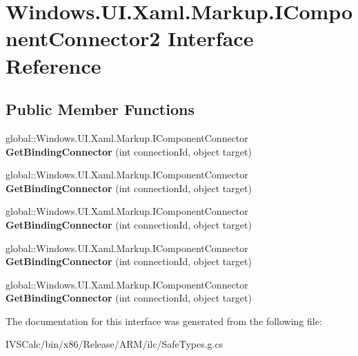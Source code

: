 \hypertarget{interface_windows_1_1_u_i_1_1_xaml_1_1_markup_1_1_i_component_connector2}{}\section{Windows.\+U\+I.\+Xaml.\+Markup.\+I\+Component\+Connector2 Interface Reference}
\label{interface_windows_1_1_u_i_1_1_xaml_1_1_markup_1_1_i_component_connector2}
\subsection*{Public Member Functions}
\begin{DoxyCompactItemize}
\item 
\mbox{\label{interface_windows_1_1_u_i_1_1_xaml_1_1_markup_1_1_i_component_connector2_ac161ef07e2cf95c2368e57429a0616c1}} 
global\+::\+Windows.\+U\+I.\+Xaml.\+Markup.\+I\+Component\+Connector {\bfseries Get\+Binding\+Connector} (int connection\+Id, object target)
\item 
\mbox{\label{interface_windows_1_1_u_i_1_1_xaml_1_1_markup_1_1_i_component_connector2_ac161ef07e2cf95c2368e57429a0616c1}} 
global\+::\+Windows.\+U\+I.\+Xaml.\+Markup.\+I\+Component\+Connector {\bfseries Get\+Binding\+Connector} (int connection\+Id, object target)
\item 
\mbox{\label{interface_windows_1_1_u_i_1_1_xaml_1_1_markup_1_1_i_component_connector2_ac161ef07e2cf95c2368e57429a0616c1}} 
global\+::\+Windows.\+U\+I.\+Xaml.\+Markup.\+I\+Component\+Connector {\bfseries Get\+Binding\+Connector} (int connection\+Id, object target)
\item 
\mbox{\label{interface_windows_1_1_u_i_1_1_xaml_1_1_markup_1_1_i_component_connector2_ac161ef07e2cf95c2368e57429a0616c1}} 
global\+::\+Windows.\+U\+I.\+Xaml.\+Markup.\+I\+Component\+Connector {\bfseries Get\+Binding\+Connector} (int connection\+Id, object target)
\item 
\mbox{\label{interface_windows_1_1_u_i_1_1_xaml_1_1_markup_1_1_i_component_connector2_ac161ef07e2cf95c2368e57429a0616c1}} 
global\+::\+Windows.\+U\+I.\+Xaml.\+Markup.\+I\+Component\+Connector {\bfseries Get\+Binding\+Connector} (int connection\+Id, object target)
\end{DoxyCompactItemize}


The documentation for this interface was generated from the following file\+:\begin{DoxyCompactItemize}
\item 
I\+V\+S\+Calc/bin/x86/\+Release/\+A\+R\+M/ilc/Safe\+Types.\+g.\+cs\end{DoxyCompactItemize}

